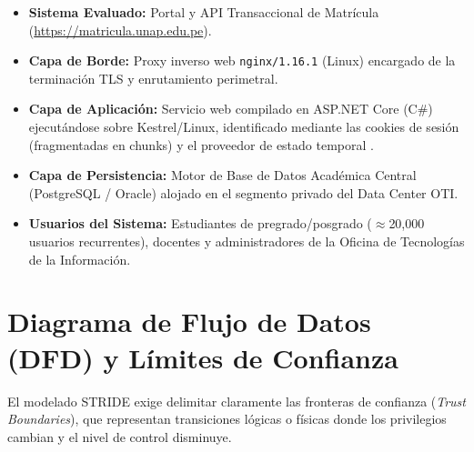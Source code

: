 \begin{itemize}[itemsep=1.5pt,topsep=1pt,parsep=0pt]
    \item \textbf{Sistema Evaluado:} Portal y API Transaccional de Matrícula (\url{https://matricula.unap.edu.pe}).
    \item \textbf{Capa de Borde:} Proxy inverso web \texttt{nginx/1.16.1} (Linux) encargado de la terminación TLS y enrutamiento perimetral.
    \item \textbf{Capa de Aplicación:} Servicio web compilado en ASP.NET Core (C\#) ejecutándose sobre Kestrel/Linux, identificado mediante las cookies de sesión  (fragmentadas en chunks) y el proveedor de estado temporal .
    \item \textbf{Capa de Persistencia:} Motor de Base de Datos Académica Central (PostgreSQL / Oracle) alojado en el segmento privado del Data Center OTI.
    \item \textbf{Usuarios del Sistema:} Estudiantes de pregrado/posgrado ($\approx$20,000 usuarios recurrentes), docentes y administradores de la Oficina de Tecnologías de la Información.
\end{itemize}

\section{Diagrama de Flujo de Datos (DFD) y Límites de Confianza}

El modelado STRIDE exige delimitar claramente las fronteras de confianza (\textit{Trust Boundaries}), que representan transiciones lógicas o físicas donde los privilegios cambian y el nivel de control disminuye.

